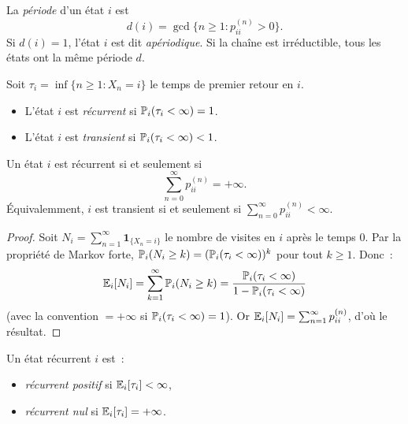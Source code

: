 \begin{definition}[P\'eriode]
La \emph{p\'eriode} d'un \'etat $i$ est
\[
  d(i) = \gcd\{n \geq 1 : p_{ii}^{(n)} > 0\}.
\]
Si $d(i) = 1$, l'\'etat $i$ est dit \emph{ap\'eriodique}. Si la cha\^ine est
irr\'eductible, tous les \'etats ont la m\^eme p\'eriode $d$.
\end{definition}

\begin{definition}
\label{def:recurrence}
Soit $\tau_i = \inf\{n \geq 1 : X_n = i\}$ le temps de premier retour en $i$.
\begin{itemize}
  \item L'\'etat $i$ est \emph{r\'ecurrent} si $\mathbb{P}_i(\tau_i < \infty) = 1$.
  \item L'\'etat $i$ est \emph{transient} si $\mathbb{P}_i(\tau_i < \infty) < 1$.
\end{itemize}
\end{definition}

\begin{theoreme}
\label{thm:critere_recurrence}
Un \'etat $i$ est r\'ecurrent si et seulement si
\[
  \sum_{n=0}^{\infty} p_{ii}^{(n)} = +\infty.
\]
\'Equivalemment, $i$ est transient si et seulement si $\sum_{n=0}^{\infty} p_{ii}^{(n)} < \infty$.
\end{theoreme}

\begin{proof}
Soit $N_i = \sum_{n=1}^{\infty} \mathbf{1}_{\{X_n = i\}}$ le nombre de visites en $i$
apr\`es le temps $0$. Par la propri\'et\'e de Markov forte,
$\mathbb{P}_i(N_i \geq k) = (\mathbb{P}_i(\tau_i < \infty))^k$ pour tout $k \geq 1$. Donc~:
\[
  \mathbb{E}_i[N_i] = \sum_{k=1}^{\infty} \mathbb{P}_i(N_i \geq k)
  = \frac{\mathbb{P}_i(\tau_i < \infty)}{1 - \mathbb{P}_i(\tau_i < \infty)}
\]
(avec la convention $= +\infty$ si $\mathbb{P}_i(\tau_i < \infty) = 1$).
Or $\mathbb{E}_i[N_i] = \sum_{n=1}^{\infty} p_{ii}^{(n)}$, d'o\`u le r\'esultat.
\end{proof}

\begin{definition}
Un \'etat r\'ecurrent $i$ est~:
\begin{itemize}
  \item \emph{r\'ecurrent positif} si $\mathbb{E}_i[\tau_i] < \infty$,
  \item \emph{r\'ecurrent nul} si $\mathbb{E}_i[\tau_i] = +\infty$.
\end{itemize}
\end{definition}

